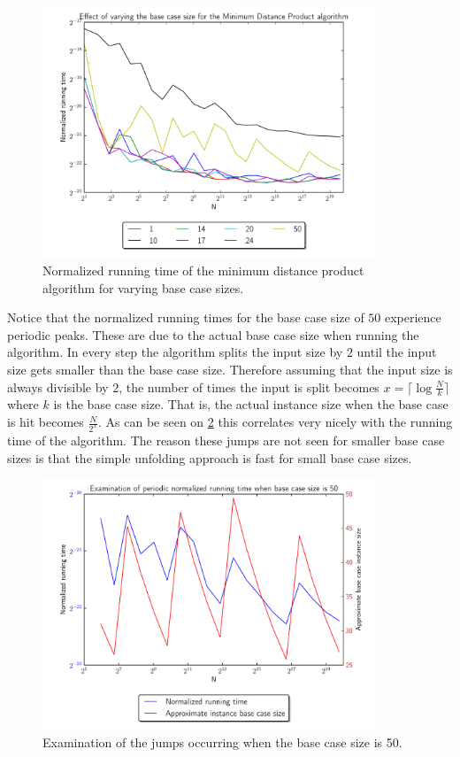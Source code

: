 \documentclass[twoside,11pt,openright]{report}
\begin{document}
\begin{figure}[h!]
  \centering
  \includegraphics[width=10cm]{distance-mult/min-dist-mult-bc}
  \caption{Normalized running time of the minimum distance product algorithm for varying base case sizes.}
  \label{fig:benchmark:min-distance:bc}
\end{figure}

Notice that the normalized running times for the base case size of $50$ experience periodic peaks. These are due to the actual base case size when running the algorithm. In every step the algorithm splits the input size by $2$ until the input size gets smaller than the base case size. Therefore assuming that the input size is always divisible by $2$, the number of times the input is split becomes $x = \lceil \log{\frac{N}{k}} \rceil$ where $k$ is the base case size. That is, the actual instance size when the base case is hit becomes $\frac{N}{2^x}$. As can be seen on \cref{fig:benchmark:min-distance:bc50} this correlates very nicely with the running time of the algorithm. The reason these jumps are not seen for smaller base case sizes is that the simple unfolding approach is fast for small base case sizes.

\begin{figure}[h!]
  \centering
  \includegraphics[width=10cm]{distance-mult/min-dist-mult-bc50}
  \caption{Examination of the jumps occurring when the base case size is 50.}
  \label{fig:benchmark:min-distance:bc50}
\end{figure}
\end{document}
